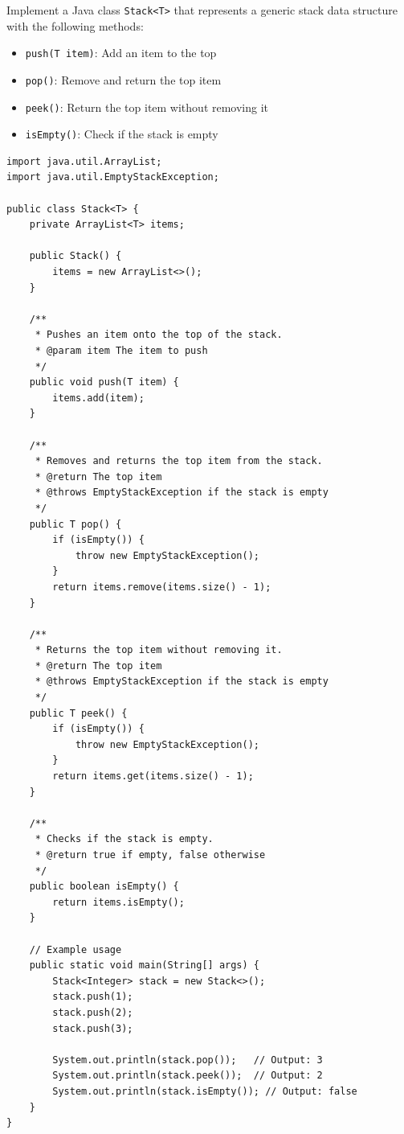 \begin{problem}
Implement a Java class \texttt{Stack<T>} that represents a generic stack data structure with the following methods:
\begin{itemize}
    \item \texttt{push(T item)}: Add an item to the top
    \item \texttt{pop()}: Remove and return the top item
    \item \texttt{peek()}: Return the top item without removing it
    \item \texttt{isEmpty()}: Check if the stack is empty
\end{itemize}
\end{problem}

\begin{solution}
\begin{lstlisting}[style=java, caption={Generic Stack implementation in Java}]
import java.util.ArrayList;
import java.util.EmptyStackException;

public class Stack<T> {
    private ArrayList<T> items;

    public Stack() {
        items = new ArrayList<>();
    }

    /**
     * Pushes an item onto the top of the stack.
     * @param item The item to push
     */
    public void push(T item) {
        items.add(item);
    }

    /**
     * Removes and returns the top item from the stack.
     * @return The top item
     * @throws EmptyStackException if the stack is empty
     */
    public T pop() {
        if (isEmpty()) {
            throw new EmptyStackException();
        }
        return items.remove(items.size() - 1);
    }

    /**
     * Returns the top item without removing it.
     * @return The top item
     * @throws EmptyStackException if the stack is empty
     */
    public T peek() {
        if (isEmpty()) {
            throw new EmptyStackException();
        }
        return items.get(items.size() - 1);
    }

    /**
     * Checks if the stack is empty.
     * @return true if empty, false otherwise
     */
    public boolean isEmpty() {
        return items.isEmpty();
    }

    // Example usage
    public static void main(String[] args) {
        Stack<Integer> stack = new Stack<>();
        stack.push(1);
        stack.push(2);
        stack.push(3);

        System.out.println(stack.pop());   // Output: 3
        System.out.println(stack.peek());  // Output: 2
        System.out.println(stack.isEmpty()); // Output: false
    }
}
\end{lstlisting}
\end{solution}

